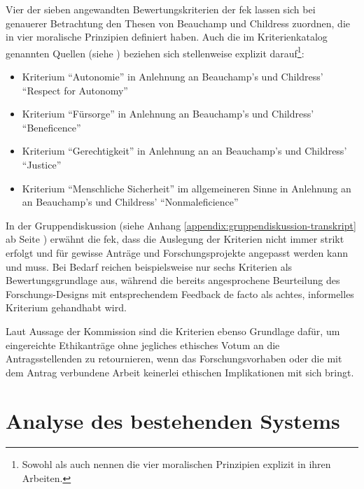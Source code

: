 \documentclass[a4paper,12pt,twoside]{scrreprt}
\begin{document}
\clearpage

Vier der sieben angewandten Bewertungskriterien der \ac{fek} lassen sich bei genauerer Betrachtung den Thesen von Beauchamp und Childress zuordnen, die in \cite{beauchamp_principles_1994} vier moralische Prinzipien definiert haben. Auch die im Kriterienkatalog genannten Quellen (siehe \cite[2]{forschungsethik-kommission_der_fachhochschule_vorarlberg_kriterienkatalog_2021}) beziehen sich stellenweise explizit darauf\footnote{Sowohl \cite{marckmann_was_2000} als auch \cite{schuchter_care_2018} nennen die vier moralischen Prinzipien explizit in ihren Arbeiten.}:
\begin{itemize}
    \item Kriterium \enquote{Autonomie} in Anlehnung an Beauchamp's und Childress' \enquote{Respect for Autonomy} \cite[101-149]{beauchamp_principles_1994}
    \item Kriterium \enquote{Fürsorge} in Anlehnung an Beauchamp's und Childress' \enquote{Beneficence} \cite[202-248]{beauchamp_principles_1994}
    \item Kriterium \enquote{Gerechtigkeit} in Anlehnung an an Beauchamp's und Childress' \enquote{Justice} \cite[249-301]{beauchamp_principles_1994}
    \item Kriterium \enquote{Menschliche Sicherheit} im allgemeineren Sinne in Anlehnung an an Beauchamp's und Childress' \enquote{Nonmaleficience} \cite[150-201]{beauchamp_principles_1994}
\end{itemize}

In der Gruppendiskussion (siehe Anhang \ref{appendix:gruppendiskussion-transkript} ab Seite \pageref{appendix:gruppendiskussion-transkript}) erwähnt die \acl{fek}, dass die Auslegung der Kriterien nicht immer strikt erfolgt und für gewisse Anträge und Forschungsprojekte angepasst werden kann und muss. Bei Bedarf reichen beispielsweise nur sechs Kriterien als Bewertungsgrundlage aus, während die bereits angesprochene Beurteilung des Forschungs-Designs mit entsprechendem Feedback de facto als achtes, informelles Kriterium gehandhabt wird.

Laut Aussage der Kommission sind die Kriterien ebenso Grundlage dafür, um eingereichte Ethikanträge ohne jegliches ethisches Votum an die Antragsstellenden zu retournieren, wenn das Forschungsvorhaben oder die mit dem Antrag verbundene Arbeit keinerlei ethischen Implikationen mit sich bringt.

\chapter{Analyse des bestehenden Systems}
\label{chap:analyse-bestehendes-system}
\end{document}
